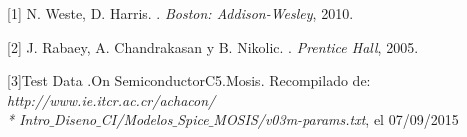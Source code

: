 \documentclass[12pt,a4paper]{article} %
\begin{document}
\begin{thebibliography}{3}


[1] N. Weste, D. Harris. 
.
\newblock \emph{Boston: Addison-Wesley}, 2010.

[2] J. Rabaey, A. Chandrakasan y B. Nikolic. 
.
\newblock \emph{Prentice Hall}, 2005.

[3]Test Data .On SemiconductorC5.Mosis. Recompilado de:
\newblock \emph{http://www.ie.itcr.ac.cr/achacon/ \\* Intro$\_$Diseno$\_$CI/Modelos$\_$Spice$\_$MOSIS/v03m-params.txt}, el 07/09/2015

\end{thebibliography}
\end{document}
